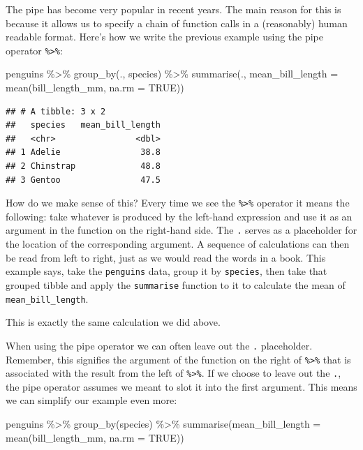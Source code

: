 \documentclass[
]{book}
\newenvironment{Shaded}{\begin{snugshade}}{\end{snugshade}}
\newcommand{\AttributeTok}[1]{\textcolor[rgb]{0.77,0.63,0.00}{#1}}
\newcommand{\ConstantTok}[1]{\textcolor[rgb]{0.00,0.00,0.00}{#1}}
\newcommand{\FunctionTok}[1]{\textcolor[rgb]{0.00,0.00,0.00}{#1}}
\newcommand{\NormalTok}[1]{#1}
\newcommand{\SpecialCharTok}[1]{\textcolor[rgb]{0.00,0.00,0.00}{#1}}
\begin{document}
The pipe has become very popular in recent years. The main reason for this is because it allows us to specify a chain of function calls in a (reasonably) human readable format. Here's how we write the previous example using the pipe operator \texttt{\%\textgreater{}\%}:

\begin{Shaded}
\begin{Highlighting}[]
\NormalTok{penguins }\SpecialCharTok{\%\textgreater{}\%} \FunctionTok{group\_by}\NormalTok{(., species) }\SpecialCharTok{\%\textgreater{}\%} \FunctionTok{summarise}\NormalTok{(., }\AttributeTok{mean\_bill\_length =} \FunctionTok{mean}\NormalTok{(bill\_length\_mm, }\AttributeTok{na.rm =} \ConstantTok{TRUE}\NormalTok{))}
\end{Highlighting}
\end{Shaded}

\begin{verbatim}
## # A tibble: 3 x 2
##   species   mean_bill_length
##   <chr>                <dbl>
## 1 Adelie                38.8
## 2 Chinstrap             48.8
## 3 Gentoo                47.5
\end{verbatim}

How do we make sense of this? Every time we see the \texttt{\%\textgreater{}\%} operator it means the following: take whatever is produced by the left-hand expression and use it as an argument in the function on the right-hand side. The \texttt{.} serves as a placeholder for the location of the corresponding argument. A sequence of calculations can then be read from left to right, just as we would read the words in a book. This example says, take the \texttt{penguins} data, group it by \texttt{species}, then take that grouped tibble and apply the \texttt{summarise} function to it to calculate the mean of \texttt{mean\_bill\_length}.

This is exactly the same calculation we did above.

When using the pipe operator we can often leave out the \texttt{.} placeholder. Remember, this signifies the argument of the function on the right of \texttt{\%\textgreater{}\%} that is associated with the result from the left of \texttt{\%\textgreater{}\%}. If we choose to leave out the \texttt{.}, the pipe operator assumes we meant to slot it into the first argument. This means we can simplify our example even more:

\begin{Shaded}
\begin{Highlighting}[]
\NormalTok{penguins }\SpecialCharTok{\%\textgreater{}\%} \FunctionTok{group\_by}\NormalTok{(species) }\SpecialCharTok{\%\textgreater{}\%} \FunctionTok{summarise}\NormalTok{(}\AttributeTok{mean\_bill\_length =} \FunctionTok{mean}\NormalTok{(bill\_length\_mm, }\AttributeTok{na.rm =} \ConstantTok{TRUE}\NormalTok{))}
\end{Highlighting}
\end{Shaded}
\end{document}
